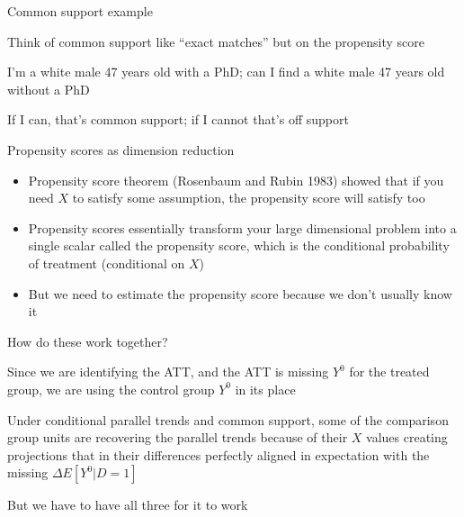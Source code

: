 \documentclass{beamer}
\begin{document}
\begin{frame}{Common support example}

Think of common support like ``exact matches'' but on the propensity score

\bigskip

I'm a white male 47 years old with a PhD; can I find a white male 47 years old without a PhD

\bigskip

If I can, that's common support; if I cannot that's off support

\end{frame}


\begin{frame}{Propensity scores as dimension reduction}

\begin{itemize}

\item Propensity score theorem (Rosenbaum and Rubin 1983) showed that if you need $X$ to satisfy some assumption, the propensity score will satisfy too
\item Propensity scores essentially transform your large dimensional problem into a single scalar called the propensity score, which is the conditional probability of treatment (conditional on $X$)
\item But we need to estimate the propensity score because we don't usually know it

\end{itemize}

\end{frame}



\begin{frame}{How do these work together?}

Since we are identifying the ATT, and the ATT is missing $Y^0$ for the treated group, we are using the control group $Y^0$ in its place

\bigskip

Under conditional parallel trends and common support, some of the comparison group units are recovering the parallel trends because of their $X$ values creating projections that in their differences perfectly aligned in expectation with the missing $\Delta E[Y^0|D=1]$

\bigskip

But we have to have all three for it to work

\end{frame}
\end{document}
